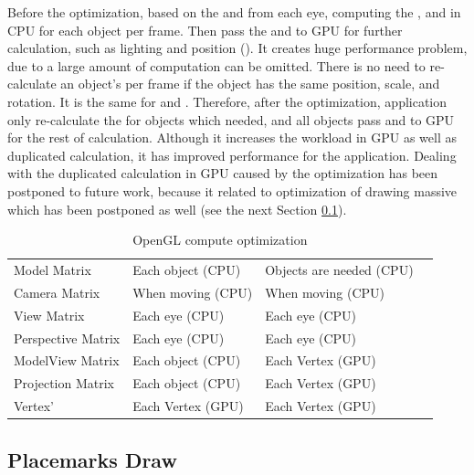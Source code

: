 Before the optimization, based on the  and  from each eye, computing the ,  and  in CPU for each object per frame. Then pass the  and  to GPU for further calculation, such as lighting and position (). It creates huge performance problem, due to a large amount of computation can be omitted. There is no need to re-calculate an object's  per frame if the object has the same position, scale, and rotation. It is the same for  and . Therefore, after the optimization, application only re-calculate the  for objects which needed, and all objects pass  and  to GPU for the rest of calculation. Although it increases the workload in GPU as well as duplicated calculation, it has improved performance for the application. Dealing with the duplicated calculation in GPU caused by the optimization has been postponed to future work, because it related to optimization of drawing massive  which has been postponed as well (see the next Section \ref{section:placemarks-draw}).

\begin{table}[H]
	\caption{OpenGL compute optimization}
	\label{tab:opengl-compute-optimization}
	\centering
	\begin{tabular}{l l l l}
		\toprule
		\tabhead{What} & \tabhead{Before} & \tabhead{After}\\
		\midrule
		Model Matrix & Each object (CPU) & Objects are needed (CPU)\\
		Camera Matrix & When moving (CPU) &  When moving (CPU)\\
		View Matrix & Each eye (CPU) & Each eye (CPU)\\
		Perspective Matrix & Each eye (CPU) & Each eye (CPU)\\
		ModelView Matrix & Each object (CPU) & Each Vertex (GPU)\\
		Projection Matrix & Each object (CPU) & Each Vertex (GPU)\\
		Vertex' & Each Vertex (GPU) & Each Vertex (GPU)\\
		\bottomrule
	\end{tabular}
\end{table}


\subsection{Placemarks Draw}
\label{section:placemarks-draw}

